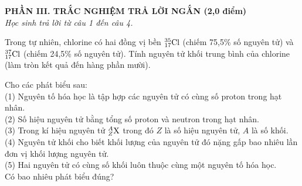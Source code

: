 \documentclass[11pt,a4paper]{article}
\begin{document}
\vspace{4pt}
\noindent
{\color{mainGreen}\textbf{\Large PHẦN III. TRẮC NGHIỆM TRẢ LỜI NGẮN (2,0 điểm)}}\\
\textit{\small Học sinh trả lời từ câu 1 đến câu 4.}
\vspace{2pt}

\begin{ex}
Trong tự nhiên, chlorine có hai đồng vị bền $^{35}_{17}\ce{Cl}$ (chiếm 75,5\% số nguyên tử) và $^{37}_{17}\ce{Cl}$ (chiếm 24,5\% số nguyên tử). Tính nguyên tử khối trung bình của chlorine (làm tròn kết quả đến hàng phần mười).

\end{ex}
\begin{ex}
Cho các phát biểu sau:\\
(1) Nguyên tố hóa học là tập hợp các nguyên tử có cùng số proton trong hạt nhân.\\
(2) Số hiệu nguyên tử bằng tổng số proton và neutron trong hạt nhân.\\
(3) Trong kí hiệu nguyên tử $^A_Z\ce{X}$ trong đó $Z$ là số hiệu nguyên tử, $A$ là số khối.\\
(4) Nguyên tử khối cho biết khối lượng của nguyên tử đó nặng gấp bao nhiêu lần đơn vị khối lượng nguyên tử.\\
(5) Hai nguyên tử có cùng số khối luôn thuộc cùng một nguyên tố hóa học.\\
Có bao nhiêu phát biểu đúng?

\end{ex}
\end{document}
